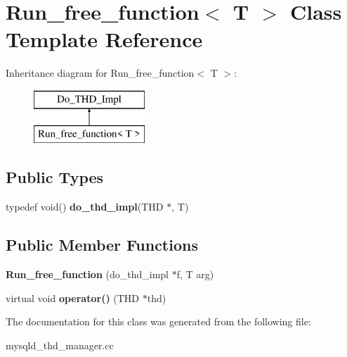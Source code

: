 \hypertarget{classRun__free__function}{}\section{Run\+\_\+free\+\_\+function$<$ T $>$ Class Template Reference}
\label{classRun__free__function}
Inheritance diagram for Run\+\_\+free\+\_\+function$<$ T $>$\+:\begin{figure}[H]
\begin{center}
\leavevmode
\includegraphics[height=2.000000cm]{classRun__free__function}
\end{center}
\end{figure}
\subsection*{Public Types}
\begin{DoxyCompactItemize}
\item 
\mbox{\label{classRun__free__function_a13bf26d9001e973af2ea444e6eff9a22}} 
typedef void() {\bfseries do\+\_\+thd\+\_\+impl}(T\+HD $\ast$, T)
\end{DoxyCompactItemize}
\subsection*{Public Member Functions}
\begin{DoxyCompactItemize}
\item 
\mbox{\label{classRun__free__function_acb65bb90a46b2fb9fe43971df1fd1712}} 
{\bfseries Run\+\_\+free\+\_\+function} (do\+\_\+thd\+\_\+impl $\ast$f, T arg)
\item 
\mbox{\label{classRun__free__function_ad056569563feb628e823dd2ca1c22938}} 
virtual void {\bfseries operator()} (T\+HD $\ast$thd)
\end{DoxyCompactItemize}


The documentation for this class was generated from the following file\+:\begin{DoxyCompactItemize}
\item 
mysqld\+\_\+thd\+\_\+manager.\+cc\end{DoxyCompactItemize}
